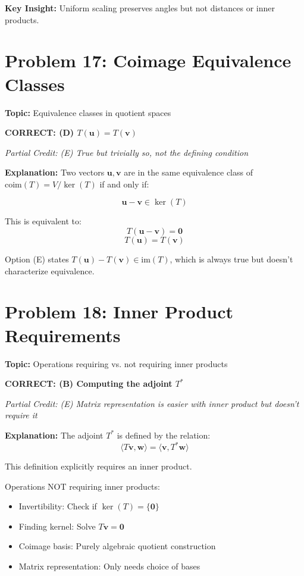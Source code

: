 \documentclass[12pt]{amsart}
\newcommand{\correct}[1]{{\color{blue}\textbf{CORRECT: #1}}}
\newcommand{\partcred}[1]{{\color{red}\textit{Partial Credit: #1}}}
\newcommand{\hint}{\textbf{Key Insight: }}
\begin{document}
\hint Uniform scaling preserves angles but not distances or inner products.

\hrulefill

\section*{Problem 17: Coimage Equivalence Classes}
\textbf{Topic:} Equivalence classes in quotient spaces

\correct{(D) $T(\mathbf{u}) = T(\mathbf{v})$}

\partcred{(E) True but trivially so, not the defining condition}

\textbf{Explanation:} 
Two vectors $\mathbf{u}, \mathbf{v}$ are in the same equivalence class of $\text{coim}(T) = V/\ker(T)$ if and only if:

$$\mathbf{u} - \mathbf{v} \in \ker(T)$$

This is equivalent to:
$$T(\mathbf{u} - \mathbf{v}) = \mathbf{0}$$
$$T(\mathbf{u}) = T(\mathbf{v})$$

Option (E) states $T(\mathbf{u}) - T(\mathbf{v}) \in \text{im}(T)$, which is always true but doesn't characterize equivalence.

\hrulefill

\section*{Problem 18: Inner Product Requirements}
\textbf{Topic:} Operations requiring vs. not requiring inner products

\correct{(B) Computing the adjoint $T^*$}

\partcred{(E) Matrix representation is easier with inner product but doesn't require it}

\textbf{Explanation:} 
The adjoint $T^*$ is defined by the relation:
$$\langle T\mathbf{v}, \mathbf{w}\rangle = \langle\mathbf{v}, T^*\mathbf{w}\rangle$$

This definition explicitly requires an inner product.

Operations NOT requiring inner products:
\begin{itemize}
\item Invertibility: Check if $\ker(T) = \{\mathbf{0}\}$
\item Finding kernel: Solve $T\mathbf{v} = \mathbf{0}$
\item Coimage basis: Purely algebraic quotient construction
\item Matrix representation: Only needs choice of bases
\end{itemize}
\end{document}
